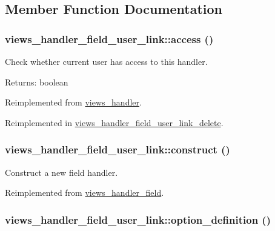 \subsection{Member Function Documentation}
\hypertarget{classviews__handler__field__user__link_00708207b597556c70cba91816a03963}{
\subsubsection[{access}]{\setlength{\rightskip}{0pt plus 5cm}views\_\-handler\_\-field\_\-user\_\-link::access ()}}
\label{classviews__handler__field__user__link_00708207b597556c70cba91816a03963}


Check whether current user has access to this handler.

\begin{Desc}
\item[Returns:]boolean \end{Desc}


Reimplemented from \hyperlink{classviews__handler_3f2fbfe1e0849d06ae77149412b821f6}{views\_\-handler}.

Reimplemented in \hyperlink{classviews__handler__field__user__link__delete_2b7406dc052b9c2a6970ac45344c6635}{views\_\-handler\_\-field\_\-user\_\-link\_\-delete}.\hypertarget{classviews__handler__field__user__link_3c0e66ff0504b344066db923819456f7}{
\subsubsection[{construct}]{\setlength{\rightskip}{0pt plus 5cm}views\_\-handler\_\-field\_\-user\_\-link::construct ()}}
\label{classviews__handler__field__user__link_3c0e66ff0504b344066db923819456f7}


Construct a new field handler. 

Reimplemented from \hyperlink{classviews__handler__field_3d50050864c255b71c842972a45d39f6}{views\_\-handler\_\-field}.\hypertarget{classviews__handler__field__user__link_61509d4fd4bc1c98a52e550c56d42b5d}{
\subsubsection[{option\_\-definition}]{\setlength{\rightskip}{0pt plus 5cm}views\_\-handler\_\-field\_\-user\_\-link::option\_\-definition ()}}
\label{classviews__handler__field__user__link_61509d4fd4bc1c98a52e550c56d42b5d}


